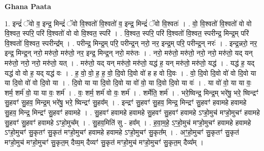 \documentclass[17pt]{extarticle}
\begin{document}
\textbf{Ghana Paata } \newline

1. इन्द्रं॑ ॅवो व॒ इन्द्र॒ मिन्द्रं॑ ॅवो वि॒श्वतो॑ वि॒श्वतो॑ व॒ इन्द्र॒ मिन्द्रं॑ ॅवो वि॒श्वतः॑ । . वो॒ वि॒श्वतो॑ वि॒श्वतो॑ वो वो वि॒श्वत॒ स्परि॒ परि॑ वि॒श्वतो॑ वो वो वि॒श्वत॒ स्परि॑ । . वि॒श्वत॒ स्परि॒ परि॑ वि॒श्वतो॑ वि॒श्वत॒ स्परीन्द्र॒ मिन्द्र॒म् परि॑ वि॒श्वतो॑ वि॒श्वत॒ स्परीन्द्र᳚म् । . परीन्द्र॒ मिन्द्र॒म् परि॒ परीन्द्र॒न् नरो॒ नर॒ इन्द्र॒म् परि॒ परीन्द्र॒न् नरः॑ । . इन्द्र॒न्नरो॒ नर॒ इन्द्र॒ मिन्द्र॒न् नरो॒ मरु॑तो॒ मरु॑तो॒ नर॒ इन्द्र॒ मिन्द्र॒न् नरो॒ मरु॑तः । . नरो॒ मरु॑तो॒ मरु॑तो॒ नरो॒ नरो॒ मरु॑तो॒ यद् यन् मरु॑तो॒ नरो॒ नरो॒ मरु॑तो॒ यत् । . मरु॑तो॒ यद् यन् मरु॑तो॒ मरु॑तो॒ यद्ध॑ ह॒ यन् मरु॑तो॒ मरु॑तो॒ यद्ध॑ । . यद्ध॑ ह॒ यद् यद्ध॑ वो वो ह॒ यद् यद्ध॑ वः । . ह॒ वो॒ वो॒ ह॒ ह॒ वो॒ दि॒वो दि॒वो वो॑ ह ह वो दि॒वः । . वो॒ दि॒वो दि॒वो वो॑ वो दि॒वो या या दि॒वो वो॑ वो दि॒वो या । . दि॒वो या या दि॒वो दि॒वो या वो॑ वो॒ या दि॒वो दि॒वो या वः॑ । . या वो॑ वो॒ या या वः॒ शर्म॒ शर्म॑ वो॒ या या वः॒ शर्म॑ । . वः॒ शर्म॒ शर्म॑ वो वः॒ शर्म॑ । . शर्मेति॒ शर्म॑ । . भरे॒ष्विन्द्र॒ मिन्द्र॒म् भरे॑षु॒ भरे॒ ष्विन्द्रꣳ॑ सु॒हवꣳ॑ सु॒हव॒ मिन्द्र॒म् भरे॑षु॒ भरे॒ ष्विन्द्रꣳ॑ सु॒हव᳚म् । . इन्द्रꣳ॑ सु॒हवꣳ॑ सु॒हव॒ मिन्द्र॒ मिन्द्रꣳ॑ सु॒हवꣳ॑ हवामहे हवामहे सु॒हव॒ मिन्द्र॒ मिन्द्रꣳ॑ सु॒हवꣳ॑ हवामहे । . सु॒हवꣳ॑ हवामहे हवामहे सु॒हवꣳ॑ सु॒हवꣳ॑ हवामहे ऽꣳहो॒मुच॑ मꣳहो॒मुचꣳ॑ हवामहे सु॒हवꣳ॑ सु॒हवꣳ॑ हवामहे ऽꣳहो॒मुच᳚म् । . सु॒हव॒मिति॑ सु - हव᳚म् । . ह॒वा॒म॒हे॒ ऽꣳ॒हो॒मुच॑ मꣳहो॒मुचꣳ॑ हवामहे हवामहे ऽꣳहो॒मुचꣳ॑ सु॒कृतꣳ॑ सु॒कृत॑ मꣳहो॒मुचꣳ॑ हवामहे हवामहे ऽꣳहो॒मुचꣳ॑ सु॒कृत᳚म् । . अꣳ॒॒हो॒मुचꣳ॑ सु॒कृतꣳ॑ सु॒कृत॑ मꣳहो॒मुच॑ मꣳहो॒मुचꣳ॑ सु॒कृत॒म् दैव्य॒म् दैव्यꣳ॑ सु॒कृत॑ मꣳहो॒मुच॑ मꣳहो॒मुचꣳ॑ सु॒कृत॒म् दैव्य᳚म् । \newline
\end{document}
